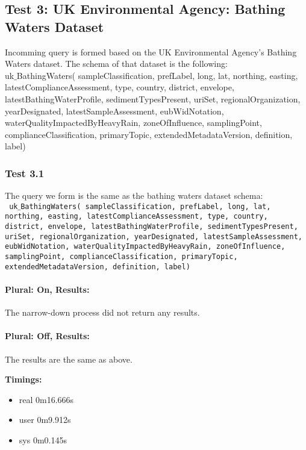\documentclass[a4paper,10pt]{article}
\begin{document}
\subsection{Test 3: UK Environmental Agency: Bathing Waters Dataset}
Incomming query is formed based on the UK Environmental Agency's Bathing Waters dataset. The schema of that dataset is the 
following:\\
\indent  uk$\_$BathingWaters( sampleClassification, prefLabel, long, lat, northing, easting,  latestComplianceAssessment, type, country, district,  envelope, latestBathingWaterProfile, sedimentTypesPresent, uriSet, regionalOrganization, yearDesignated, latestSampleAssessment, eubWidNotation, waterQualityImpactedByHeavyRain, zoneOfInfluence, samplingPoint, complianceClassification, primaryTopic, extendedMetadataVersion, definition, label)

\subsubsection{Test 3.1} 

The query we form is the same as the bathing waters dataset schema:\\
\indent \texttt{ uk$\_$BathingWaters( sampleClassification, prefLabel, long, lat, northing, easting,  latestComplianceAssessment, type, country, district,  envelope, latestBathingWaterProfile, sedimentTypesPresent, uriSet, regionalOrganization, yearDesignated, latestSampleAssessment, eubWidNotation, waterQualityImpactedByHeavyRain, zoneOfInfluence, samplingPoint, complianceClassification, primaryTopic, extendedMetadataVersion, definition, label)}
\paragraph{Plural: On, Results: } The narrow-down process did not return any results.
\paragraph{Plural: Off, Results: } The results are the same as above.


\textbf{Timings:}
\begin{itemize}
\item real	0m16.666s
\item user	0m9.912s
\item sys	0m0.145s

\end{itemize}
\end{document}
